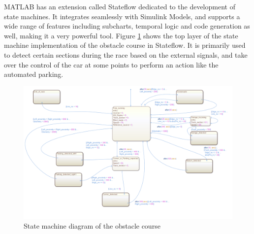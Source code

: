 \textsf{MATLAB} has an extension called \textsf{Stateflow} dedicated to the development of state machines. It integrates seamlessly with \textsf{Simulink} Models, and supports a wide range of features including subcharts, temporal logic and code generation as well, making it a very powerful tool. Figure \ref{fig:stateflow} shows the top layer of the state machine implementation of the obstacle course in \textsf{Stateflow}. It is primarily used to detect certain sections during the race based on the external signals, and take over the control of the car at some points to perform an action like the automated parking.

\begin{figure}[!ht]
    \centering
    \includegraphics[width=0.7\linewidth]{img/stateflow}
    \centering
    \caption{State machine diagram of the obstacle course}
    \label{fig:stateflow}
\end{figure}





